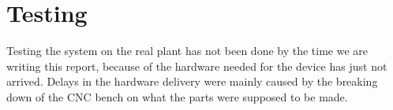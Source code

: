 \section{Testing}

Testing the system on the real plant has not been done by the time we are writing this report, because of the hardware needed for the device has just not arrived.
Delays in the hardware delivery were mainly caused by the breaking down of the CNC bench on what the parts were supposed to be made.